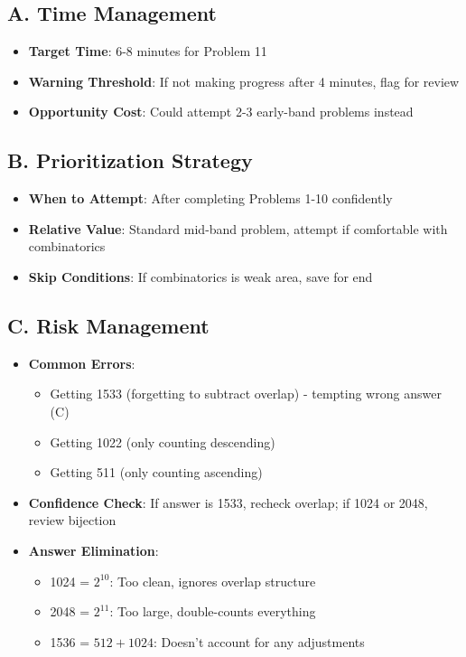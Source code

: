 \documentclass[]{article}
\begin{document}
\begin{competitionbox}
\subsection*{A. Time Management}
\begin{itemize}[leftmargin=*]
    \item \textbf{Target Time}: 6-8 minutes for Problem 11
    \item \textbf{Warning Threshold}: If not making progress after 4 minutes, flag for review
    \item \textbf{Opportunity Cost}: Could attempt 2-3 early-band problems instead
\end{itemize}

\subsection*{B. Prioritization Strategy}
\begin{itemize}[leftmargin=*]
    \item \textbf{When to Attempt}: After completing Problems 1-10 confidently
    \item \textbf{Relative Value}: Standard mid-band problem, attempt if comfortable with combinatorics
    \item \textbf{Skip Conditions}: If combinatorics is weak area, save for end
\end{itemize}

\subsection*{C. Risk Management}
\begin{itemize}[leftmargin=*]
    \item \textbf{Common Errors}: 
    \begin{itemize}
        \item Getting 1533 (forgetting to subtract overlap) - tempting wrong answer (C)
        \item Getting 1022 (only counting descending)
        \item Getting 511 (only counting ascending)
    \end{itemize}
    
    \item \textbf{Confidence Check}: If answer is 1533, recheck overlap; if 1024 or 2048, review bijection
    
    \item \textbf{Answer Elimination}: 
    \begin{itemize}
        \item 1024 = $2^{10}$: Too clean, ignores overlap structure
        \item 2048 = $2^{11}$: Too large, double-counts everything
        \item 1536 = $512 + 1024$: Doesn't account for any adjustments
    \end{itemize}
\end{itemize}


\end{competitionbox}
\end{document}
